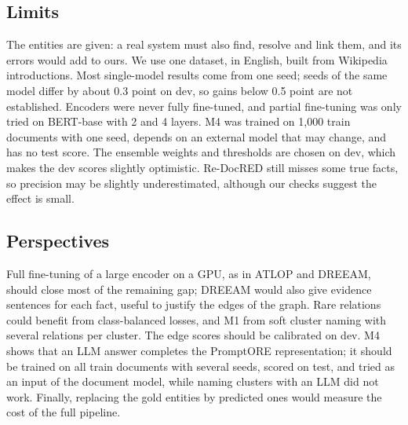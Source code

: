 \documentclass[pdflatex,sn-mathphys-num]{sn-jnl}
\begin{document}
\subsection{Limits}

The entities are given: a real system must also find, resolve and link them, and its errors would add to ours. We use one dataset, in English, built from Wikipedia introductions. Most single-model results come from one seed; seeds of the same model differ by about 0.3 point on dev, so gains below 0.5 point are not established. Encoders were never fully fine-tuned, and partial fine-tuning was only tried on BERT-base with 2 and 4 layers. M4 was trained on 1,000 train documents with one seed, depends on an external model that may change, and has no test score. The ensemble weights and thresholds are chosen on dev, which makes the dev scores slightly optimistic. Re-DocRED still misses some true facts, so precision may be slightly underestimated, although our checks suggest the effect is small.

\subsection{Perspectives}

Full fine-tuning of a large encoder on a GPU, as in ATLOP and DREEAM, should close most of the remaining gap; DREEAM would also give evidence sentences for each fact, useful to justify the edges of the graph. Rare relations could benefit from class-balanced losses, and M1 from soft cluster naming with several relations per cluster. The edge scores should be calibrated on dev. M4 shows that an LLM answer completes the PromptORE representation; it should be trained on all train documents with several seeds, scored on test, and tried as an input of the document model, while naming clusters with an LLM did not work. Finally, replacing the gold entities by predicted ones would measure the cost of the full pipeline.


\end{document}
